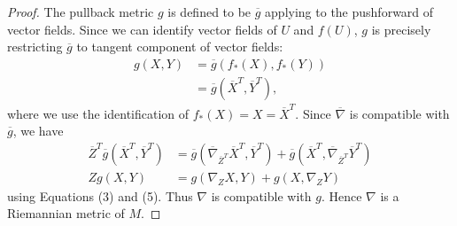 \documentclass[12pt]{article}
\begin{document}
\begin{proof}
The pullback metric $ g$ is defined to be  $ \overline{g}$ applying to the pushforward of vector fields. Since we can identify vector fields of $ U$ and  $ f(U)$, $ g$ is precisely restricting  $ \overline{g}$ to tangent component of vector fields:
\begin{align}
	g(X,Y) &= \overline{g}(f_*(X),f_*(Y))\\
	&= \overline{g}\left( \overline{X}^{T}, \overline{Y}^{T} \right)  ,
\end{align}
where we use the identification of $ f_*(X) = X = \overline{X}^{T}$. Since $\overline{\nabla }$ is compatible with $ \overline{g}$, we have
\begin{align*}
	\overline{Z}^{T} \overline{g}(\overline{X}^{T},\overline{Y}^{T}) &= \overline{g}(\overline{\nabla}_{ \overline{Z}^{T}} \overline{X}^{T},\overline{Y}^{T}) + \overline{g}(\overline{X}^{T}, \overline{\nabla }_{ \overline{Z}^{T}} \overline{Y}^{T}) \\ 
	Z g(X,Y)&= g(\nabla _Z X, Y) + g(X, \nabla _Z Y) 
\end{align*}
using Equations (3) and (5). Thus $ \nabla $  is compatible with $ g$. Hence  $ \nabla $ is a Riemannian metric of $ M$.

\end{proof}
\end{document}
